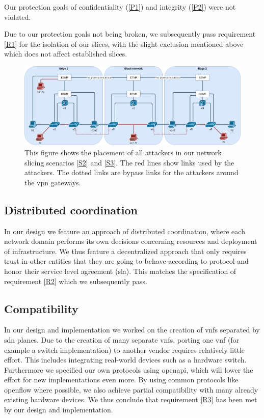 Our protection goals of confidentiality (\ref{P1}) and integrity (\ref{P2}) were not violated.

Due to our protection goals not being broken, we subsequently pass requirement \ref{R1} for the isolation of our slices, with the slight exclusion mentioned above which does not affect established slices.

    \begin{figure}[ht]
        \centering
        \includegraphics[width=\linewidth]{images/chapter_7/attackers_topo.png}
        \caption[Placement of attackers in scenario S2 and S3]{This figure shows the placement of all attackers in our network slicing scenarios \ref{S2} and \ref{S3}. The red lines show links used by the attackers. The dotted links are bypass links for the attackers around the \acrshort{vpn} gateways.}
        \label{fig:attackers_topo}
    \end{figure}

\subsection{Distributed coordination}
In our design we feature an approach of distributed coordination, where each network domain performs its own decisions concerning resources and deployment of infrastructure. We thus feature a decentralized approach that only requires trust in other entities that they are going to behave according to protocol and honor their service level agreement (\acrshort{sla}). This matches the specification of requirement \ref{R2} which we subsequently pass.

\subsection{Compatibility}
In our design and implementation we worked on the creation of \acrshort{vnf}s separated by \acrshort{sdn} planes. Due to the creation of many separate \acrshort{vnf}s, porting one \acrshort{vnf} (for example a switch implementation) to another vendor requires relatively little effort. This includes integrating real-world devices such as a hardware switch. Furthermore we specified our own protocols using \Gls{openapi}, which will lower the effort for new implementations even more. By using common protocols like \Gls{openflow} where possible, we also achieve partial compatibility with many already existing hardware devices. We thus conclude that requirement \ref{R3} has been met by our design and implementation.

